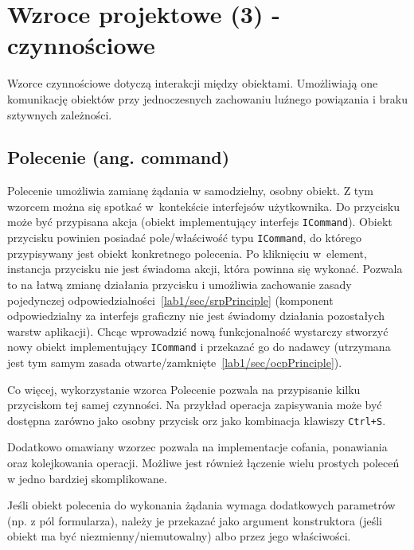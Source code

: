 \section{Wzroce projektowe (3) - czynnościowe }

Wzorce czynnościowe dotyczą interakcji między obiektami. Umożliwiają one komunikację obiektów przy jednoczesnych zachowaniu luźnego powiązania i braku sztywnych zależności.

\subsection{Polecenie (ang. command)}
Polecenie umożliwia zamianę żądania w samodzielny, osobny obiekt. Z tym wzorcem można się spotkać w~kontekście interfejsów użytkownika. Do przycisku może być przypisana akcja (obiekt implementujący interfejs \texttt{ICommand}). Obiekt przycisku powinien posiadać pole/właściwość typu \texttt{ICommand}, do którego przypisywany jest obiekt konkretnego polecenia. Po kliknięciu w~element, instancja przycisku nie jest świadoma akcji, która powinna się wykonać. Pozwala to na łatwą zmianę działania przycisku i umożliwia zachowanie zasady pojedynczej odpowiedzialności~\ref{lab1/sec/srpPrinciple} (komponent odpowiedzialny za interfejs graficzny nie jest świadomy działania pozostałych warstw aplikacji). Chcąc wprowadzić nową funkcjonalność wystarczy stworzyć nowy obiekt implementujący \texttt{ICommand} i przekazać go do nadawcy (utrzymana jest tym samym zasada otwarte/zamknięte~\ref{lab1/sec/ocpPrinciple}). 

Co więcej, wykorzystanie wzorca Polecenie pozwala na przypisanie kilku przyciskom tej samej czynności. Na przykład operacja zapisywania może być dostępna zarówno jako osobny przycisk orz jako kombinacja klawiszy \texttt{Ctrl+S}.

Dodatkowo omawiany wzorzec pozwala na implementacje cofania, ponawiania oraz kolejkowania operacji. Możliwe jest również łączenie wielu prostych poleceń w jedno bardziej skomplikowane.

Jeśli obiekt polecenia do wykonania żądania wymaga dodatkowych parametrów (np. z pól formularza), należy je przekazać jako argument konstruktora (jeśli obiekt ma być niezmienny/niemutowalny) albo przez jego właściwości.





